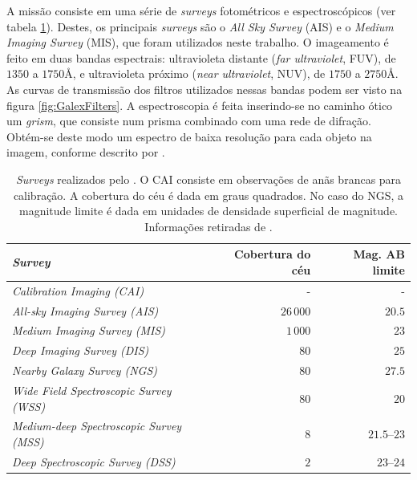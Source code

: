 A missão consiste em uma série de {\em surveys} fotométricos e espectroscópicos
(ver tabela \ref{tab:GalexSurveys}). Destes, os principais {\em surveys} são o
{\em All Sky Survey} (AIS) e o {\em Medium Imaging Survey} (MIS), que foram
utilizados neste trabalho. O imageamento é feito em duas bandas espectrais:
ultravioleta distante ({\em far ultraviolet}, FUV), de $1350$ a $1750$\AA, e
ultravioleta próximo ({\em near ultraviolet}, NUV), de $1750$ a $2750$\AA. As
curvas de transmissão dos filtros utilizados nessas bandas podem ser visto na
figura \ref{fig:GalexFilters}. A espectroscopia é feita inserindo-se no caminho
ótico um {\em grism}, que consiste num prisma combinado com uma rede de
difração. Obtém-se deste modo um espectro de baixa resolução para cada objeto na
imagem, conforme descrito por \citet{Morrissey2007}.

\begin{table}
	\caption[{\em Surveys} realizados pelo \galex.]{{\em Surveys} realizados pelo
	\galex. O CAI consiste em observações de anãs brancas para calibração. A
	cobertura do céu é dada em graus quadrados. No caso do NGS, a magnitude limite
	é dada em unidades de densidade superficial de magnitude. Informações retiradas
	de \citet{Martin2005}.}
	\begin{tabular}{l r r}
		{\em Survey} & Cobertura do céu & Mag. AB limite \\ 
		\midrule
		{\em Calibration Imaging (CAI)}              &         - &            - \\
		{\em All-sky Imaging Survey (AIS)}           & $26\,000$ &       $20.5$ \\
		{\em Medium Imaging Survey (MIS)}            &  $1\,000$ &         $23$ \\
		{\em Deep Imaging Survey (DIS)}              &      $80$ &         $25$ \\
		{\em Nearby Galaxy Survey (NGS)}             &      $80$ &       $27.5$ \\
		{\em Wide Field Spectroscopic Survey (WSS)}  &      $80$ &         $20$ \\
		{\em Medium-deep Spectroscopic Survey (MSS)} &       $8$ & $21.5$--$23$ \\
		{\em Deep Spectroscopic Survey (DSS)}        &       $2$ &   $23$--$24$ \\
	\end{tabular}
	\label{tab:GalexSurveys}
\end{table}

